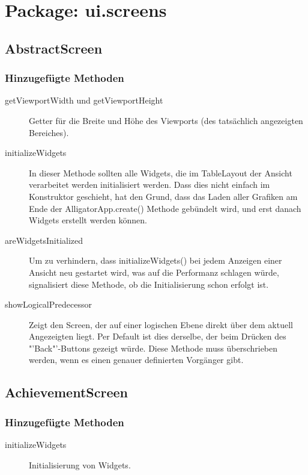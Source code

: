 \section{Package: ui.screens}

\subsection{AbstractScreen}

\subsubsection{Hinzugefügte Methoden}
\begin{description}
\item[getViewportWidth und getViewportHeight]
Getter für die Breite und Höhe des Viewports (des tatsächlich angezeigten Bereiches).

\item[initializeWidgets]
In dieser Methode sollten alle Widgets, die im TableLayout der Ansicht verarbeitet werden initialisiert werden. Dass dies nicht einfach im Konstruktor geschieht, hat den Grund, dass das Laden aller Grafiken am Ende der AlligatorApp.create() Methode gebündelt wird, und erst danach Widgets erstellt werden können.
\item[areWidgetsInitialized]
Um zu verhindern, dass initializeWidgets() bei jedem Anzeigen einer Ansicht neu gestartet wird, was auf die Performanz schlagen würde, signalisiert diese Methode, ob die Initialisierung schon erfolgt ist.
\item[showLogicalPredecessor]
Zeigt den Screen, der auf einer logischen Ebene direkt über dem aktuell Angezeigten liegt. Per Default ist dies derselbe, der beim Drücken des "'Back"'-Buttons gezeigt würde. Diese Methode muss überschrieben werden, wenn es einen genauer definierten Vorgänger gibt.

\end{description}


\subsection{AchievementScreen}

\subsubsection{Hinzugefügte Methoden}
\begin{description}
\item[initializeWidgets]
Initialisierung von Widgets.

\end{description}

